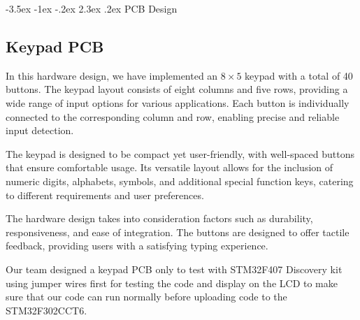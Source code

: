 \documentclass[a4paper, twoside]{report}
\makeatletter
\renewcommand\section{\@startsection {section}{1}{-1em}%
  {-3.5ex \@plus -1ex \@minus -.2ex}%
  {2.3ex \@plus.2ex}%
  {\normalfont\Large\bfseries}}
\makeatother
\begin{document}
\section{PCB Design}
\subsection{Keypad PCB}
In this hardware design, we have implemented an $8\times 5$ keypad with a total of 40 buttons. The keypad layout consists of eight columns and five rows, providing a wide range of input options for various applications. Each button is individually connected to the corresponding column and row, enabling precise and reliable input detection.

The keypad is designed to be compact yet user-friendly, with well-spaced buttons that ensure comfortable usage. Its versatile layout allows for the inclusion of numeric digits, alphabets, symbols, and additional special function keys, catering to different requirements and user preferences.

The hardware design takes into consideration factors such as durability, responsiveness, and ease of integration. The buttons are designed to offer tactile feedback, providing users with a satisfying typing experience.

Our team designed a keypad PCB only to test with STM32F407 Discovery kit using jumper wires first for testing the code and display on the LCD to make sure that our code can run normally before uploading code to the STM32F302CCT6.
\end{document}
